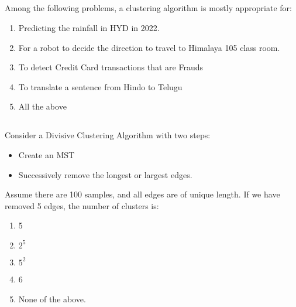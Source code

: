 \begin{frame}
\section{}
Among the following problems, a clustering algorithm is mostly appropriate for:

\begin{enumerate}[label=(\Alph*)]
\item Predicting the rainfall in HYD in 2022.
\item For a robot to decide the direction to travel to Himalaya 105 class room.
\item To detect Credit Card transactions that are Frauds    %
\item To translate a sentence from Hindo to Telugu
\item All the above  %
\end{enumerate}
\end{frame}

\begin{frame}
\section{}
Consider a Divisive Clustering Algorithm with two steps:
\begin{itemize}
\item Create an MST
\item Successively remove the longest or largest edges.
\end{itemize}
Assume there are 100 samples, and all edges are of unique length. If we have removed 5 edges, the number of clusters is:
\begin{enumerate}[label=(\Alph*)]
\item 5
\item $2^5$
\item $5^2$
\item 6   %
\item None of the above.    %
\end{enumerate}
\end{frame}

